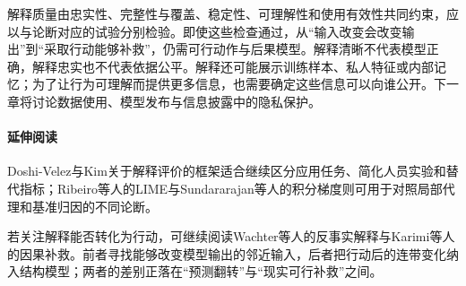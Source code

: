解释质量由忠实性、完整性与覆盖、稳定性、可理解性和使用有效性共同约束，应以与论断对应的试验分别检验。即使这些检查通过，从“输入改变会改变输出”到“采取行动能够补救”，仍需可行动作与后果模型。解释清晰不代表模型正确，解释忠实也不代表依据公平。解释还可能展示训练样本、私人特征或内部记忆；为了让行为可理解而提供更多信息，也需要确定这些信息可以向谁公开。下一章将讨论数据使用、模型发布与信息披露中的隐私保护。

\paragraph{延伸阅读}

Doshi-Velez与Kim关于解释评价的框架适合继续区分应用任务、简化人员实验和替代指标；Ribeiro等人的LIME与Sundararajan等人的积分梯度则可用于对照局部代理和基准归因的不同论断。

若关注解释能否转化为行动，可继续阅读Wachter等人的反事实解释与Karimi等人的因果补救。前者寻找能够改变模型输出的邻近输入，后者把行动后的连带变化纳入结构模型；两者的差别正落在“预测翻转”与“现实可行补救”之间。
